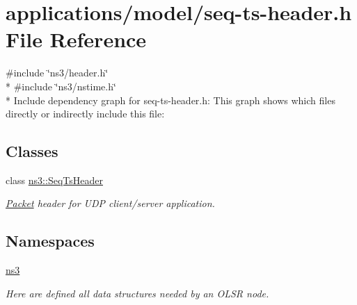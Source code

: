 \hypertarget{seq-ts-header_8h}{}\section{applications/model/seq-\/ts-\/header.h File Reference}
\label{seq-ts-header_8h}
{\ttfamily \#include \char`\"{}ns3/header.\+h\char`\"{}}\\*
{\ttfamily \#include \char`\"{}ns3/nstime.\+h\char`\"{}}\\*
Include dependency graph for seq-\/ts-\/header.h\+:
This graph shows which files directly or indirectly include this file\+:
\subsection*{Classes}
\begin{DoxyCompactItemize}
\item 
class \hyperlink{classns3_1_1SeqTsHeader}{ns3\+::\+Seq\+Ts\+Header}
\begin{DoxyCompactList}\small\item\em \hyperlink{classns3_1_1Packet}{Packet} header for U\+DP client/server application. \end{DoxyCompactList}\end{DoxyCompactItemize}
\subsection*{Namespaces}
\begin{DoxyCompactItemize}
\item 
 \hyperlink{namespacens3}{ns3}
\begin{DoxyCompactList}\small\item\em Here are defined all data structures needed by an O\+L\+SR node. \end{DoxyCompactList}\end{DoxyCompactItemize}
